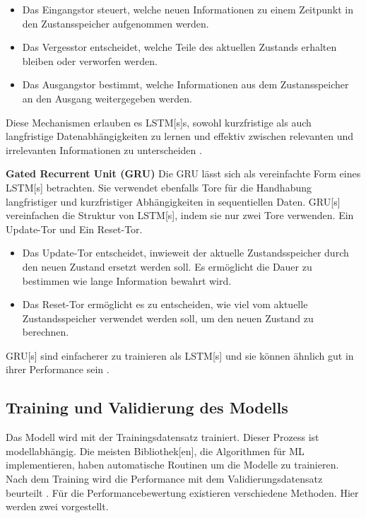 \begin{itemize}
    \item Das Eingangstor steuert, welche neuen Informationen zu einem Zeitpunkt in den Zustansspeicher aufgenommen werden.
    \item  Das Vergesstor entscheidet, welche Teile des aktuellen Zustands erhalten bleiben oder verworfen werden.
    \item Das Ausgangstor bestimmt, welche Informationen aus dem Zustansspeicher an den Ausgang weitergegeben werden.
\end{itemize}

Diese Mechanismen erlauben es \acrshort{LSTM}[s]s, sowohl kurzfristige als auch langfristige Datenabhängigkeiten zu lernen und effektiv zwischen relevanten und irrelevanten Informationen zu unterscheiden \cite{Burkov.2019, Goodfellow.2016}. \par

\textbf{Gated Recurrent Unit (\acrshort{GRU})}
Die \acrshort{GRU} lässt sich als vereinfachte Form eines \acrshort{LSTM}[s] betrachten. Sie verwendet ebenfalls Tore für die Handhabung langfristiger und kurzfristiger Abhängigkeiten in sequentiellen Daten. \acrshort{GRU}[s] vereinfachen die Struktur von \acrshort{LSTM}[s], indem sie nur zwei Tore verwenden. Ein Update-Tor und Ein Reset-Tor. \par

\begin{itemize}
    \item Das Update-Tor entscheidet, inwieweit der aktuelle Zustandsspeicher durch den neuen Zustand ersetzt werden soll. Es ermöglicht die Dauer zu bestimmen wie lange Information bewahrt wird.
    \item Das Reset-Tor ermöglicht es zu entscheiden, wie viel vom aktuelle Zustandsspeicher verwendet werden soll, um den neuen Zustand zu berechnen.
\end{itemize}

\acrshort{GRU}[s] sind einfacherer zu trainieren als \acrshort{LSTM}[s] und sie können ähnlich gut in ihrer Performance sein \cite{Lazzeri.2021, Goodfellow.2016}. 



\subsection{Training und Validierung des Modells} \label{sec:ML Metriken, Valid}
Das Modell wird mit der \gls{Trainingsdatensatz} trainiert. Dieser Prozess ist modellabhängig. Die meisten \gls{Bibliothek}[en], die Algorithmen für \gls{ML} implementieren, haben automatische Routinen um die Modelle zu trainieren. Nach dem Training wird die Performance mit dem Validierungsdatensatz beurteilt \cite{Burkov.2019, Geron.2019, Zheng.2015}. Für die Performancebewertung existieren verschiedene Methoden. Hier werden zwei vorgestellt. \dubpar

